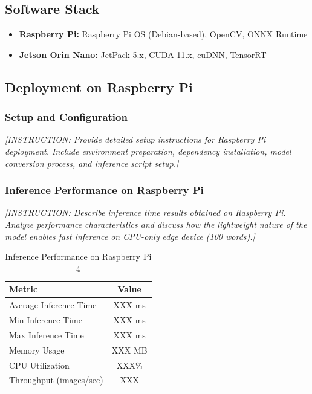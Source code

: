 \documentclass[11pt,a4paper]{article}
\begin{document}
\subsection{Software Stack}

\begin{itemize}
    \item \textbf{Raspberry Pi:} Raspberry Pi OS (Debian-based), OpenCV, ONNX Runtime
    \item \textbf{Jetson Orin Nano:} JetPack 5.x, CUDA 11.x, cuDNN, TensorRT
\end{itemize}

\subsection{Deployment on Raspberry Pi}

\subsubsection{Setup and Configuration}

\textit{[INSTRUCTION: Provide detailed setup instructions for Raspberry Pi deployment. Include 
environment preparation, dependency installation, model conversion process, and inference script setup.]}

\subsubsection{Inference Performance on Raspberry Pi}

\textit{[INSTRUCTION: Describe inference time results obtained on Raspberry Pi. Analyze performance 
characteristics and discuss how the lightweight nature of the model enables fast inference on CPU-only 
edge device (100 words).]}

\begin{table}[H]
    \centering
    \caption{Inference Performance on Raspberry Pi 4}
    \label{tab:rpi_inference}
    \begin{tabular}{|l|c|}
    \hline
    \textbf{Metric} & \textbf{Value} \\
    \hline
    Average Inference Time & XXX ms \\
    Min Inference Time & XXX ms \\
    Max Inference Time & XXX ms \\
    Memory Usage & XXX MB \\
    CPU Utilization & XXX\% \\
    Throughput (images/sec) & XXX \\
    \hline
    \end{tabular}
\end{table}
\end{document}
